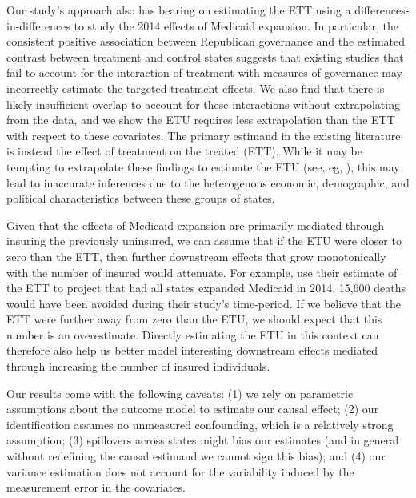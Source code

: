 \documentclass[12pt]{article}
\begin{document}
Our study's approach also has bearing on estimating the ETT using a differences-in-differences to study the 2014 effects of Medicaid expansion. In particular, the consistent positive association between Republican governance and the estimated contrast between treatment and control states suggests that existing studies that fail to account for the interaction of treatment with measures of governance may incorrectly estimate the targeted treatment effects. We also find that there is likely insufficient overlap to account for these interactions without extrapolating from the data, and we show the ETU requires less extrapolation than the ETT with respect to these covariates. The primary estimand in the existing literature is instead the effect of treatment on the treated (ETT). While it may be tempting to extrapolate these findings to estimate the ETU (see, eg, \cite{miller2019medicaid}), this may lead to inaccurate inferences due to the heterogenous economic, demographic, and political characteristics between these groups of states.

Given that the effects of Medicaid expansion are primarily mediated through insuring the previously uninsured, we can assume that if the ETU were closer to zero than the ETT, then further downstream effects that grow monotonically with the number of insured would attenuate. For example, \cite{miller2019medicaid} use their estimate of the ETT to project that had all states expanded Medicaid in 2014, 15,600 deaths would have been avoided during their study's time-period. If we believe that the ETT were further away from zero than the ETU, we should expect that this number is an overestimate. Directly estimating the ETU in this context can therefore also help us better model interesting downstream effects mediated through increasing the number of insured individuals.

Our results come with the following caveats: (1) we rely on parametric assumptions about the outcome model to estimate our causal effect; (2) our identification assumes no unmeasured confounding, which is a relatively strong assumption; (3) spillovers across states might bias our estimates (and in general without redefining the causal estimand we cannot sign this bias); and (4) our variance estimation does not account for the variability induced by the measurement error in the covariates. 
\end{document}
